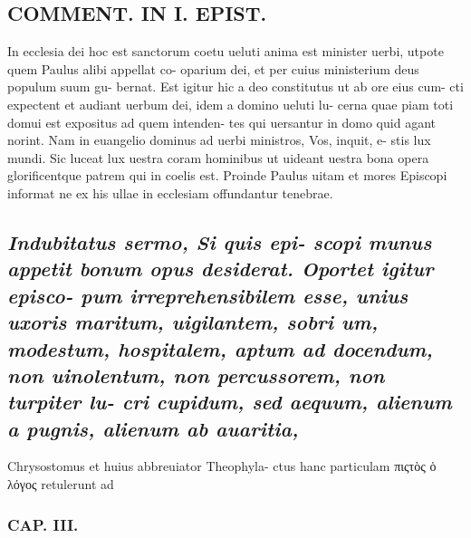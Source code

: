 \documentclass{article}
\begin{document}
\begin{pages}
\section*{COMMENT. IN I. EPIST. }\pstart In ecclesia dei hoc est sanctorum coetu ueluti anima est minister uerbi, utpote quem Paulus alibi appellat co- oparium dei, et per cuius ministerium deus populum suum gu- bernat. Est igitur hic a deo constitutus ut ab ore eius cum- cti expectent et audiant uerbum dei, idem a domino ueluti lu- cerna quae piam toti domui est expositus ad quem intenden- tes qui uersantur in domo quid agant norint. Nam in euangelio dominus ad uerbi ministros, Vos, inquit, e- stis lux mundi. Sic luceat lux uestra coram hominibus ut uideant uestra bona opera glorificentque patrem qui in coelis est. Proinde Paulus uitam et mores Episcopi informat ne ex his ullae in ecclesiam offundantur tenebrae.  \pend 
{}
{}
\subsection*{\textit{Indubitatus sermo, Si quis epi- scopi munus appetit bonum opus desiderat. Oportet igitur episco- pum irreprehensibilem esse, unius uxoris maritum, uigilantem, sobri um, modestum, hospitalem, aptum ad docendum, non uinolentum, non percussorem, non turpiter lu- cri cupidum, sed aequum, alienum a pugnis, alienum ab auaritia, }}\pstart Chrysostomus et huius abbreuiator Theophyla- ctus hanc particulam πιςτὸς ὁ λόγος retulerunt ad  \pend
\subsubsection*{CAP. III. }
\end{pages}
\end{document}
